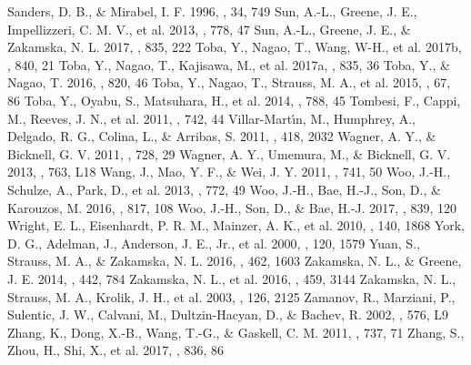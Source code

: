 \documentclass[twocolumn]{aastex6}
\begin{document}
\begin{thebibliography}{}
Sanders, D. B., \& Mirabel, I. F. 1996, \araa, 34, 749
Sun, A.-L., Greene, J. E., Impellizzeri, C. M. V., et al. 2013, \apj, 778, 47
Sun, A.-L., Greene, J. E., \& Zakamska, N. L. 2017, \apj, 835, 222
Toba, Y., Nagao, T., Wang, W-H., et al. 2017b, \apj, 840, 21
Toba, Y., Nagao, T., Kajisawa, M., et al. 2017a, \apj, 835, 36 
Toba, Y., \& Nagao, T. 2016, \apj, 820, 46
Toba, Y., Nagao, T., Strauss, M. A., et al. 2015, \pasj, 67, 86
Toba, Y., Oyabu, S., Matsuhara, H., et al. 2014, \apj, 788, 45
Tombesi, F., Cappi, M., Reeves, J. N., et al. 2011, \apj, 742, 44
Villar-Mart\'{\i}n, M., Humphrey, A., Delgado, R. G., Colina, L., \& Arribas, S. 2011, \mnras, 418, 2032
Wagner, A. Y., \& Bicknell, G. V. 2011, \apj, 728, 29
Wagner, A. Y., Umemura, M., \& Bicknell, G. V. 2013, \apjl, 763, L18
Wang, J., Mao, Y. F., \& Wei, J. Y. 2011, \apj, 741, 50
Woo, J.-H., Schulze, A., Park, D., et al. 2013, \apj, 772, 49
Woo, J.-H., Bae, H.-J., Son, D., \& Karouzos, M. 2016, \apj, 817, 108
Woo, J.-H., Son, D., \& Bae, H.-J. 2017, \apj, 839, 120
Wright, E. L., Eisenhardt, P. R. M., Mainzer, A. K., et al. 2010, \aj, 140, 1868
York, D. G., Adelman, J., Anderson, J. E., Jr., et al. 2000, \aj, 120, 1579
Yuan, S., Strauss, M. A., \& Zakamska, N. L. 2016, \mnras, 462, 1603
Zakamska, N. L., \& Greene, J. E. 2014, \mnras, 442, 784
Zakamska, N. L., et al. 2016, \mnras, 459, 3144
Zakamska, N. L., Strauss, M. A., Krolik, J. H., et al. 2003, \aj, 126, 2125
Zamanov, R., Marziani, P., Sulentic, J. W., Calvani, M., Dultzin-Hacyan, D., \& Bachev, R. 2002, \apjl, 576, L9
Zhang, K., Dong, X.-B., Wang, T.-G., \& Gaskell, C. M. 2011, \apj, 737, 71
Zhang, S., Zhou, H., Shi, X., et al. 2017, \apj, 836, 86
\end{thebibliography}
\end{document}
